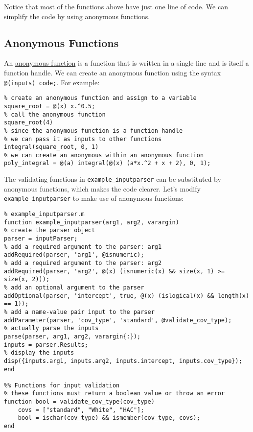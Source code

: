\documentclass[12pt, a4paper]{article}
\begin{document}
Notice that most of the functions above have just one line of code.
We can simplify the code by using anonymous functions.
\subsection{Anonymous Functions}
\label{sec:org7424a5b}
An \href{https://www.mathworks.com/help/matlab/matlab\_prog/anonymous-functions.html}{anonymous function} is a function that is written in a single line and is itself a function handle.
We can create an anonymous function using the syntax \texttt{@(inputs) code;}.
For example:
\lstset{language=matlab,label= ,caption= ,captionpos=b,firstnumber=1,numbers=left,style=Matlab-editor}
\begin{lstlisting}
% create an anonymous function and assign to a variable
square_root = @(x) x.^0.5;
% call the anonymous function
square_root(4)
% since the anonymous function is a function handle
% we can pass it as inputs to other functions
integral(square_root, 0, 1)
% we can create an anonymous within an anonymous function
poly_integral = @(a) integral(@(x) (a*x.^2 + x + 2), 0, 1);
\end{lstlisting}

The validating functions in \texttt{example\_inputparser} can be substituted by anonymous functions, which makes the code clearer.
Let's modify \texttt{example\_inputparser} to make use of anonymous functions:
\lstset{language=matlab,label= ,caption= ,captionpos=b,firstnumber=1,numbers=left,style=Matlab-editor}
\begin{lstlisting}
% example_inputparser.m
function example_inputparser(arg1, arg2, varargin)
% create the parser object
parser = inputParser;
% add a required argument to the parser: arg1
addRequired(parser, 'arg1', @isnumeric);
% add a required argument to the parser: arg2
addRequired(parser, 'arg2', @(x) (isnumeric(x) && size(x, 1) >= size(x, 2)));
% add an optional argument to the parser
addOptional(parser, 'intercept', true, @(x) (islogical(x) && length(x) == 1));
% add a name-value pair input to the parser
addParameter(parser, 'cov_type', 'standard', @validate_cov_type);
% actually parse the inputs
parse(parser, arg1, arg2, varargin{:});
inputs = parser.Results;
% display the inputs
disp({inputs.arg1, inputs.arg2, inputs.intercept, inputs.cov_type});
end

%% Functions for input validation
% these functions must return a boolean value or throw an error
function bool = validate_cov_type(cov_type)
    covs = ["standard", "White", "HAC"];
    bool = ischar(cov_type) && ismember(cov_type, covs);
end
\end{lstlisting}
\end{document}
